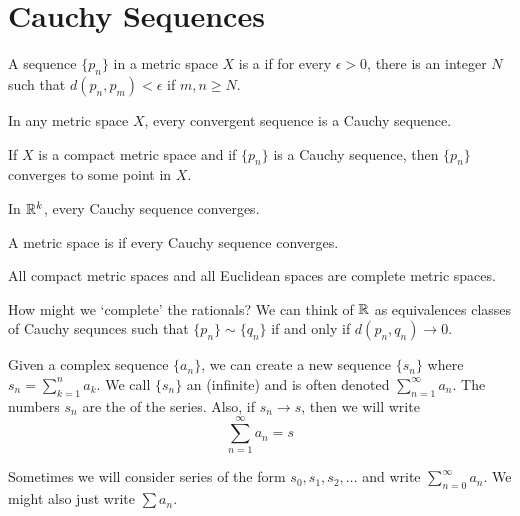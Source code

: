 \documentclass{mathnotes}
\begin{document}
\section*{Cauchy Sequences}

\begin{bdefi}
  A sequence $\{p_n\}$ in a metric space $X$ is a  if
  for every $\epsilon>0$, there is an integer $N$ such that
  $d(p_n,p_m)<\epsilon$ if $m,n\ge N$.
\end{bdefi}

\begin{prop}
  In any metric space $X$, every convergent sequence is a Cauchy sequence.
\end{prop}

\begin{prop}
  If $X$ is a compact metric space and if $\{p_n\}$ is a Cauchy sequence, then
  $\{p_n\}$ converges to some point in $X$.
\end{prop}

\begin{prop}
  In $\mathbb{R}^k$, every Cauchy sequence converges.
\end{prop}

\begin{defi}
  A metric space is  if every Cauchy sequence converges.
\end{defi}

\begin{prop}
  All compact metric spaces and all Euclidean spaces are complete metric spaces.
\end{prop}

\begin{note}
  How might we `complete' the rationals? We can think of $\mathbb{R}$ as equivalences
  classes of Cauchy sequnces such that $\{p_n\}\sim\{q_n\}$ if and only if
  $d(p_n,q_n)\to0$.
\end{note}

\begin{bdefi}
  Given a complex sequence $\{a_n\}$, we can create a new sequence $\{s_n\}$
  where $s_n=\sum_{k=1}^na_k$. We call $\{s_n\}$ an (infinite) 
  and is often denoted $\sum_{n=1}^\infty a_n$. The numbers $s_n$ are the
   of the series. Also, if $s_n\to s$, then we will write
  $$\sum_{n=1}^\infty a_n=s$$
\end{bdefi}

\begin{note}
  Sometimes we will consider series of the form $s_0,s_1,s_2,\ldots$ and write
  $\sum_{n=0}^\infty a_n$. We might also just write $\sum a_n$.
\end{note}
\end{document}
